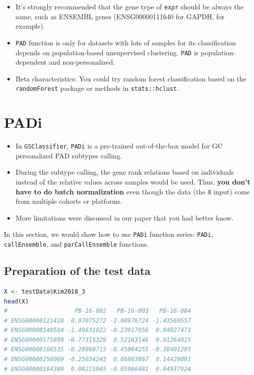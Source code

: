 \documentclass[
  12pt,
]{book}
\newcommand{\passthrough}[1]{#1}
\begin{document}
\begin{itemize}
\item
  It's strongly recommended that the gene type of \passthrough{\lstinline!expr!} should be always the same, such as ENSEMBL genes (ENSG00000111640 for GAPDH, for example).
\item
  \passthrough{\lstinline!PAD!} function is only for datasets with lots of samples for its classification depends on population-based unsupervised clustering. \passthrough{\lstinline!PAD!} is population-dependent and non-personalized.
\item
  Beta characteristics: You could try random forest classification based on the \passthrough{\lstinline!randomForest!} package or methods in \passthrough{\lstinline!stats::hclust!}.
\end{itemize}

\hypertarget{padi}{%
\section{PADi}\label{padi}}

\begin{itemize}
\item
  In \passthrough{\lstinline!GSClassifier!}, \passthrough{\lstinline!PADi!} is a pre-trained out-of-the-box model for GC personalized PAD subtypes calling.
\item
  During the subtype calling, the gene rank relations based on individuals instead of the relative values across samples would be used. Thus, \textbf{you don't have to do batch normalization} even though the data (the \passthrough{\lstinline!X!} input) come from multiple cohorts or platforms.
\item
  More limitations were discussed in our paper that you had better know.
\end{itemize}

In this section, we would show how to use \passthrough{\lstinline!PADi!} function series: \passthrough{\lstinline!PADi!}, \passthrough{\lstinline!callEnsemble!}, and \passthrough{\lstinline!parCallEnsemble!} functions.

\hypertarget{preparation-of-the-test-data-1}{%
\subsection{Preparation of the test data}\label{preparation-of-the-test-data-1}}

\begin{lstlisting}[language=R]
X <- testData$Kim2018_3
head(X)
#                   PB-16-002   PB-16-003   PB-16-004
# ENSG00000121410  0.07075272 -2.08976724 -1.43569557
# ENSG00000148584 -1.49631022 -0.23917056  0.94827471
# ENSG00000175899 -0.77315329  0.52163146  0.91264015
# ENSG00000166535 -0.28860715 -0.45964255 -0.38401295
# ENSG00000256069 -0.25034243  0.06863867  0.14429081
# ENSG00000184389  0.08215945 -0.05966481  0.04937924
\end{lstlisting}
\end{document}
